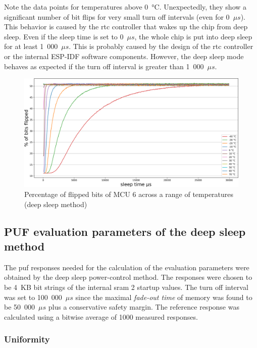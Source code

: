 Note the data points for temperatures above 0~°C. Unexpectedly, they show a significant number of bit flips for very small turn off intervals (even for 0~$\mu{}s$). This behavior is caused by the \gls{rtc} controller that wakes up the chip from deep sleep. Even if the sleep time is set to 0~$\mu{}s$, the whole chip is put into deep sleep for at least 1~000~$\mu{}s$. This is probably caused by the design of the \gls{rtc} controller or the internal ESP-IDF software components. However, the deep sleep mode behaves as expected if the turn off interval is greater than 1~000~$\mu{}s$.

\begin{figure}[ht!]
    \centering
    \captionsetup{justification=centering,margin=0.5cm}
    \includegraphics[width=\textwidth]{images/6_across_temps_deep_sleep.png}
    \caption{Percentage of flipped bits of MCU 6 across a range of temperatures (deep sleep method)}
    \label{fig:6_across_temps_deep_sleep}
\end{figure}
\subsection[PUF evaluation parameters]{PUF evaluation parameters of the deep sleep method}\label{sec:deepsleep_evaluation}

The \gls{puf} responses needed for the calculation of the evaluation parameters were obtained by the deep sleep power-control method. The responses were chosen to be 4~KB bit strings of the internal \gls{sram} 2 startup values. The turn off interval was set to 100~000~$\mu{}s$ since the maximal \emph{fade-out time} of memory was found to be 50~000~$\mu{}s$ plus a conservative safety margin. The reference response was calculated using a bitwise average of 1000 measured responses.

\subsubsection*{Uniformity}

